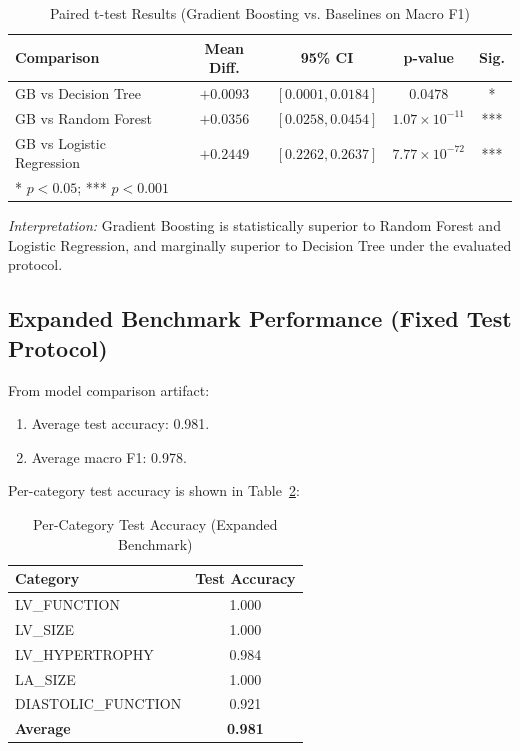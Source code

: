 \documentclass[10pt,twocolumn,letterpaper]{IEEEtran}
\begin{document}
\begin{table}[h]
\centering
\caption{Paired t-test Results (Gradient Boosting vs. Baselines on Macro F1)}
\label{tab:significance}
\small
\begin{tabular}{lcccc}
\toprule
\textbf{Comparison} & \textbf{Mean Diff.} & \textbf{95\% CI} & \textbf{p-value} & \textbf{Sig.} \\
\midrule
GB vs Decision Tree & $+0.0093$ & $[0.0001, 0.0184]$ & $0.0478$ & * \\
GB vs Random Forest & $+0.0356$ & $[0.0258, 0.0454]$ & $1.07 \times 10^{-11}$ & *** \\
GB vs Logistic Regression & $+0.2449$ & $[0.2262, 0.2637]$ & $7.77 \times 10^{-72}$ & *** \\
\bottomrule
\multicolumn{5}{l}{* $p < 0.05$; *** $p < 0.001$}
\end{tabular}
\end{table}

\textit{Interpretation:} Gradient Boosting is statistically superior to Random Forest and Logistic Regression, and marginally superior to Decision Tree under the evaluated protocol.

\subsection{Expanded Benchmark Performance (Fixed Test Protocol)}
From model comparison artifact:
\begin{enumerate}
\item Average test accuracy: 0.981.
\item Average macro F1: 0.978.
\end{enumerate}

Per-category test accuracy is shown in Table~\ref{tab:percategory}:

\begin{table}[h]
\centering
\caption{Per-Category Test Accuracy (Expanded Benchmark)}
\label{tab:percategory}
\small
\begin{tabular}{lc}
\toprule
\textbf{Category} & \textbf{Test Accuracy} \\
\midrule
LV\_FUNCTION & 1.000 \\
LV\_SIZE & 1.000 \\
LV\_HYPERTROPHY & 0.984 \\
LA\_SIZE & 1.000 \\
DIASTOLIC\_FUNCTION & 0.921 \\
\hline
\textbf{Average} & \textbf{0.981} \\
\bottomrule
\end{tabular}
\end{table}
\end{document}
